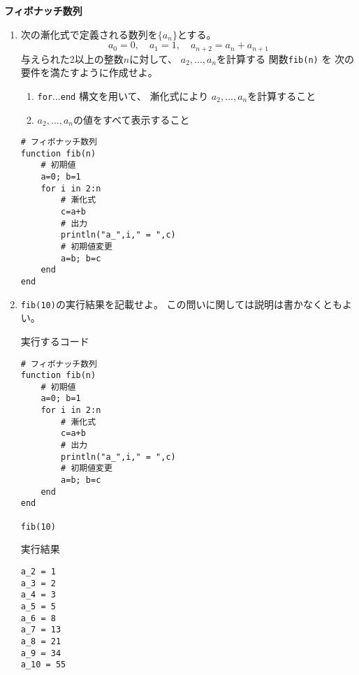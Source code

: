 \documentclass[12pt,b5paper]{ltjsarticle}
\begin{document}
\hrulefill

\textbf{フィボナッチ数列}

\begin{enumerate}
 \item
      次の漸化式で定義される数列を$\{a_n\}$とする。
      \begin{equation}
       a_0=0,
        \quad
        a_1=1,
        \quad
        a_{n+2}=a_{n}+a_{n+1}
      \end{equation}
      与えられた2以上の整数$n$に対して、
      $a_{2},\dots,a_{n}$を計算する
      関数\texttt{fib(n)}
      を
      次の要件を満たすように作成せよ。
      \begin{enumerate}
       \item
            \texttt{for}...\texttt{end}
            構文を用いて、
            漸化式により
            $a_{2},\dots,a_{n}$を計算すること
       \item
            $a_{2},\dots,a_{n}$の値をすべて表示すること
      \end{enumerate}

      \dotfill

      \begin{lstlisting}
# フィボナッチ数列
function fib(n)
    # 初期値
    a=0; b=1
    for i in 2:n
        # 漸化式
        c=a+b
        # 出力
        println("a_",i," = ",c)
        # 初期値変更
        a=b; b=c
    end
end
      \end{lstlisting}



      \hrulefill

 \item
      \texttt{fib(10)}の実行結果を記載せよ。
      この問いに関しては説明は書かなくともよい。

      \dotfill

      実行するコード
      \begin{lstlisting}
# フィボナッチ数列
function fib(n)
    # 初期値
    a=0; b=1
    for i in 2:n
        # 漸化式
        c=a+b
        # 出力
        println("a_",i," = ",c)
        # 初期値変更
        a=b; b=c
    end
end

fib(10)
      \end{lstlisting}

      実行結果
      \begin{lstlisting}
a_2 = 1
a_3 = 2
a_4 = 3
a_5 = 5
a_6 = 8
a_7 = 13
a_8 = 21
a_9 = 34
a_10 = 55
      \end{lstlisting}


      \hrulefill

\end{enumerate}

\hrulefill
\end{document}
